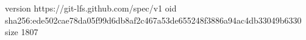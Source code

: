 version https://git-lfs.github.com/spec/v1
oid sha256:ede502cae78da05f99d6db8af2c467a53de655248f3886a94ac4db33049b6330
size 1807

